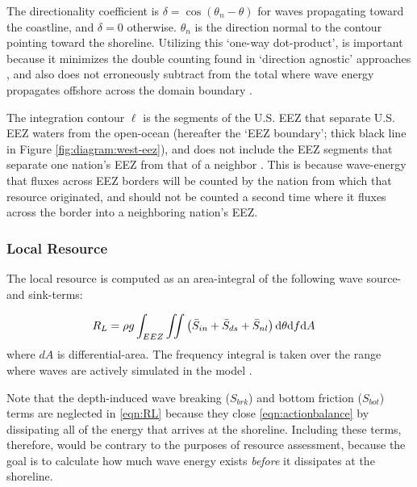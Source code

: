 The directionality coefficient is $\delta = \cos(\theta_n - \theta)$ for waves propagating toward the coastline, and $\delta = 0$ otherwise.  $\theta_n$ is the direction normal to the contour pointing toward the shoreline. Utilizing this `one-way dot-product', is important because it minimizes the double counting found in `direction agnostic' approaches \citep[e.g., ][]{EPRIwaveresource2011}, and also does not erroneously subtract from the total where wave energy propagates offshore across the domain boundary \citep{nationalresearchcouncilEvaluationDepartmentEnergy2013,gunnQuantifyingGlobalWave2012}.

The integration contour $\ell$ is the segments of the U.S. EEZ that separate U.S. EEZ waters from the open-ocean (hereafter the `EEZ boundary'; thick black line in Figure \ref{fig:diagram:west-eez}), and does not include the EEZ segments that separate one nation's EEZ from that of a neighbor \citep[]{flandersmarineinstituteMaritimeBoundariesGeodatabase2018}. This is because wave-energy that fluxes across EEZ borders will be counted by the nation from which that resource originated, and should not be counted a second time where it fluxes across the border into a neighboring nation's EEZ.

\subsubsection{Local Resource} \label{sec:method:calc:local}

The local resource is computed as an area-integral of the following wave source- and sink-terms:

\begin{align}
  R_L &= \rho g \int_{EEZ}\iint \left ( \bar{S}_{in} + \bar{S}_{ds} + \bar{S}_{nl} \right ) \mathrm{d} \theta \mathrm{d} f \mathrm{d} A
\label{eqn:RL}
\end{align}
where $dA$ is differential-area. The frequency integral is taken over the range where waves are actively simulated in the model \citep[up to $0.5$ Hz,][]{ardhuinObservationSwellDissipation2009}. 

Note that the depth-induced wave breaking ($S_{brk}$) and bottom friction ($S_{bot}$) terms are neglected in \eqref{eqn:RL} because they close \eqref{eqn:actionbalance} by dissipating all of the energy that arrives at the shoreline. Including these terms, therefore, would be contrary to the purposes of resource assessment, because the goal is to calculate how much wave energy exists \textit{before} it dissipates at the shoreline.

